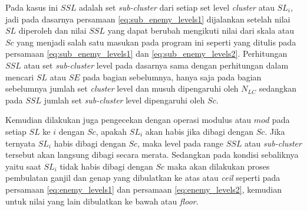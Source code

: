 Pada kasus ini $SSL$ adalah set \textit{sub-cluster} dari setiap set level \textit{cluster} atau $SL_{i}$, jadi pada dasarnya persamaan \ref{eq:sub_enemy_levels1} dijalankan setelah nilai $SL$ diperoleh dan nilai $SSL$ yang dapat berubah mengikuti nilai dari skala atau $Sc$ yang menjadi salah satu masukan pada program ini seperti yang ditulis pada persamaan \ref{eq:sub_enemy_levels1} dan \ref{eq:sub_enemy_levels2}. Perhitungan $SSL$ atau set \textit{sub-cluster} level pada dasarnya sama dengan perhitungan dalam mencari $SL$ atau $SE$ pada bagian sebelumnya, hanya saja pada bagian sebelumnya jumlah set \textit{cluster} level dan musuh dipengaruhi oleh $N_{LC}$ sedangkan pada $SSL$ jumlah set \textit{sub-cluster} level dipengaruhi oleh $Sc$.
\vspace{1ex}

Kemudian dilakukan juga pengecekan dengan operasi modulus atau $mod$ pada setiap $SL$ ke $i$ dengan $Sc$, apakah $SL_{i}$ akan habis jika dibagi dengan $Sc$. Jika ternyata $SL_{i}$ habis dibagi dengan $Sc$, maka level pada range $SSL$ atau \textit{sub-cluster} tersebut akan langsung dibagi secara merata. Sedangkan pada kondisi sebaliknya yaitu saat $SL_{i}$ tidak habis dibagi dengan $Sc$ maka akan dilakukan proses pembulatan ganjil dan genap yang dibulatkan ke atas atau \textit{ceil} seperti pada persamaan \ref{eq:enemy_levels1} dan persamaan \ref{eq:enemy_levels2}, kemudian untuk nilai yang lain dibulatkan ke bawah atau \textit{floor}.
\vspace{1ex}


